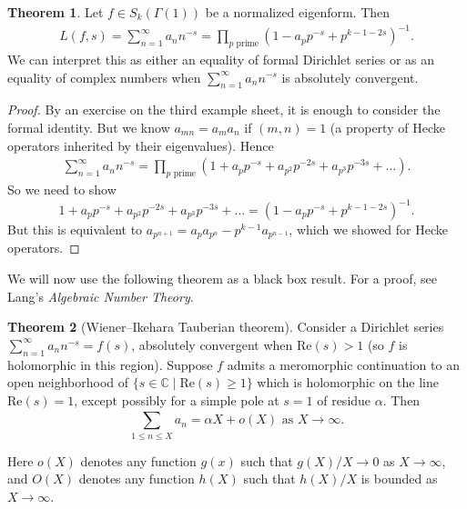 \documentclass{article}
\theoremstyle{definition}
\newtheorem{theorem}{Theorem}[section]
\begin{document}
\begin{theorem}
    Let $f \in S_k(\Gamma(1))$ be a normalized eigenform. Then 
    \begin{align*}
        L(f,s) = \sum_{n=1}^{\infty} a_n n^{-s} = \prod_{p \text{ prime}}^{} (1-a_p p^{-s} + p^{k-1-2s})^{-1}.
    \end{align*}
    We can interpret this as either an equality of formal Dirichlet series or as an equality of complex numbers when $\sum_{n=1}^{\infty} a_n n^{-s}$ is absolutely convergent.
\end{theorem}
\begin{proof}
    By an exercise on the third example sheet, it is enough to consider the formal identity. But we know $a_{mn} = a_m a_n$ if $(m,n)=1$ (a property of Hecke operators inherited by their eigenvalues). Hence
    \begin{align*}
        \sum_{n=1}^{\infty} a_n n^{-s} = \prod_{p \text{ prime}}^{} (1 + a_p p^{-s} + a_{p^2}p^{-2s} + a_{p^3} p^{-3s} + \ldots).
    \end{align*}
    So we need to show \[
        1 + a_p p^{-s} + a_{p^2}p^{-2s} + a_{p^3} p^{-3s} + \ldots = (1 - a_p p^{-s} + p^{k-1-2s})^{-1}.
    \]
    But this is equivalent to $a_{p^{n+1}} = a_p a_{p^n} - p^{k-1}a_{p^{n-1}}$, which we showed for Hecke operators.
\end{proof}
We will now use the following theorem as a black box result. For a proof, see Lang's \textit{Algebraic Number Theory}.
\begin{theorem}[Wiener--Ikehara Tauberian theorem]
    Consider a Dirichlet series $\sum_{n=1}^{\infty} a_n n^{-s} = f(s)$, absolutely convergent when $\text{Re}(s)>1$ (so $f$ is holomorphic in this region). Suppose $f$ admits a meromorphic continuation to an open neighborhood of $\{s \in \mathbb{C} \mid \text{Re}(s)\ge 1\}$ which is holomorphic on the line $\text{Re}(s)=1$, except possibly for a simple pole at $s = 1$ of residue $\alpha$. Then \[
    \sum_{1\le n\le X}^{} a_n = \alpha X + o(X) \text{ as }X \to \infty.
    \]
\end{theorem}
Here $o(X)$ denotes any function $g(x)$ such that $g(X)/X \to 0$ as $X \to \infty$, and $O(X)$ denotes any function $h(X)$ such that $h(X)/X$ is bounded as $X \to \infty$.
\vspace{1mm}
 
\end{document}
